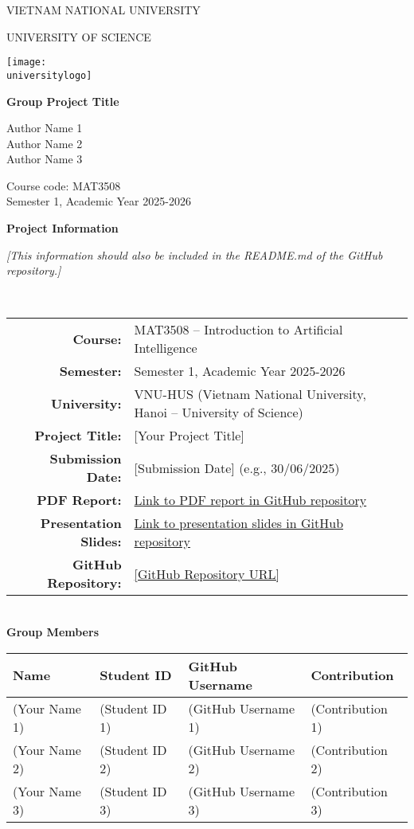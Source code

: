 \documentclass[a4paper]{book}
\newcommand{\reporttitle}{Group Project Title}
\newcommand{\reportauthors}{%
    Author Name 1\\
    Author Name 2\\
    Author Name 3
}
\newcommand{\courseinfo}{Course code: MAT3508\\ Semester 1, Academic Year 2025-2026}
\newcommand{\universitylogo}{HUS.png} %
\begin{document}
\begin{titlepage}
    \centering
    \vspace*{-1cm}
    {\LARGE\MakeUppercase{Vietnam National University}\par}
    {\LARGE\MakeUppercase{University of Science}\par}
    \vfill
    \texttt{[image: \\universitylogo]}\par\vfill
    {\Huge \bfseries \reporttitle \par}
    \vspace{1cm}
    {\Large \reportauthors \par}
    \vspace{1cm}
    {\large \courseinfo \par}
    \vfill
\end{titlepage}

\clearpage
\thispagestyle{empty}
\begin{center}
    {\LARGE \textbf{Project Information}}\\[1.5em]
    \parbox{0.85\textwidth}{
        \textit{[This information should also be included in the README.md of the GitHub repository.]}
    }
    \\[2em]
    \begin{tabular}{rl}
        \textbf{Course:} & MAT3508 -- Introduction to Artificial Intelligence \\
        \textbf{Semester:} & Semester 1, Academic Year 2025-2026 \\
        \textbf{University:} & VNU-HUS (Vietnam National University, Hanoi -- University of Science) \\
        \textbf{Project Title:} & {[Your Project Title]} \\
        \textbf{Submission Date:} & {[Submission Date]} (e.g., 30/06/2025) \\
        \textbf{PDF Report:} & \href{[PDF Link]}{Link to PDF report in GitHub repository} \\
        \textbf{Presentation Slides:} & \href{[Slides Link]}{Link to presentation slides in GitHub repository} \\
        \textbf{GitHub Repository:} & \url{[GitHub Repository URL]}
    \end{tabular}
    \\[2em]
    {\Large \textbf{Group Members}}\\[1em]
    \begin{tabular}{|l|l|l|l|}
        \hline
        \textbf{Name} & \textbf{Student ID} & \textbf{GitHub Username} & \textbf{Contribution} \\
        \hline
        (Your Name 1) & (Student ID 1) & (GitHub Username 1) & (Contribution 1) \\
        \hline
        (Your Name 2) & (Student ID 2) & (GitHub Username 2) & (Contribution 2) \\
        \hline
        (Your Name 3) & (Student ID 3) & (GitHub Username 3) & (Contribution 3) \\
        \hline
    \end{tabular}
\end{center}
\clearpage
\end{document}
